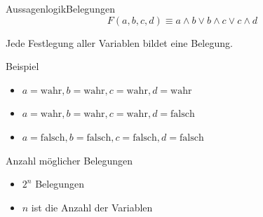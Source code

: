 \documentclass[xelatex,aspectratio=169]{beamer}
\begin{document}
\begin{frame}{Aussagenlogik}{Belegungen}
  \[ F \left(a, b, c, d\right) \equiv a \land b \lor b \land c \lor c \land d \]

  \begin{definition}
    Jede Festlegung aller Variablen bildet eine Belegung.
  \end{definition}

  \begin{exampleblock}{Beispiel}
    \begin{itemize}
      \item \( a = \text{wahr}, b = \text{wahr}, c = \text{wahr}, d = \text{wahr} \)
      \item \( a = \text{wahr}, b = \text{wahr}, c = \text{wahr}, d = \text{falsch} \)
      \item \( a = \text{falsch}, b = \text{falsch}, c = \text{falsch}, d = \text{falsch} \)
    \end{itemize}
  \end{exampleblock}

  \begin{block}{Anzahl möglicher Belegungen}
    \begin{itemize}
      \item \( 2^n \) Belegungen
      \item \( n \) ist die Anzahl der Variablen
    \end{itemize}
  \end{block}

\end{frame}
\end{document}
